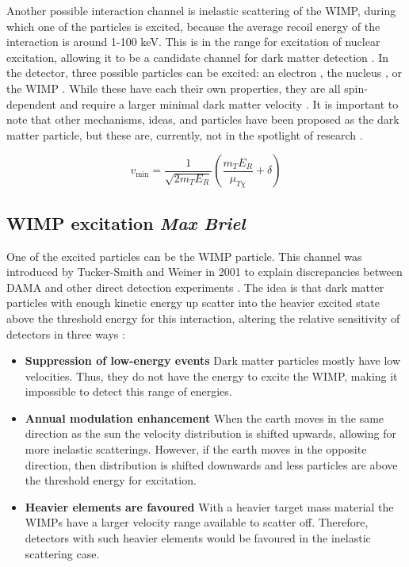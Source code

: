 \documentclass{article}
\begin{document}
Another possible interaction channel is inelastic scattering of the WIMP, during which one of the particles is excited, because the average recoil energy of the interaction is around 1-100 keV. This is in the range for excitation of nuclear excitation, allowing it to be a candidate channel for dark matter detection \cite{Goodman:1984dc, Ellis:1988nb}. In the detector, three possible particles can be excited: an electron \cite{Starkman:1994gf}, the nucleus \cite{Ellis:1988nb}, or the WIMP \cite{TuckerSmith:2001hy, TuckerSmith:2004jv, Miao:2013sqa}. While these have each their own properties, they are all spin-dependent \cite{McCabe:2015eia} and require a larger minimal dark matter velocity \cite{TuckerSmith:2001hy}. It is important to note that other mechanisms, ideas, and particles have been proposed \cite{TuckerSmith:2004jv,Foot:2013uxa, Undagoitia:2015gya, Bramante:2016rdh} as the dark matter particle, but these are, currently, not in the spotlight of research \cite{Agnese:2018col}. 

\begin{equation} \label{vmin_inel}
    v_\text{min} = \frac{1}{\sqrt{2m_TE_R}} \left(\frac{m_TE_R}{\mu_{T \chi}} + \delta \right)
\end{equation}


\subsection{WIMP excitation \small{\textit{Max Briel}}} 

One of the excited particles can be the WIMP particle. This channel was introduced by Tucker-Smith and Weiner in 2001 \cite{TuckerSmith:2001hy} to explain discrepancies between DAMA \cite{Finkbeiner:2009ug} and other direct detection experiments \cite{Chang:2008gd, Ahmed:2008eu}. The idea is that dark matter particles with enough kinetic energy up scatter into the heavier excited state above the threshold energy for this interaction, altering the relative sensitivity of detectors in three ways \cite{TuckerSmith:2001hy, TuckerSmith:2004jv, Chang:2008gd}:
\begin{itemize}
    \item \textbf{Suppression of low-energy events} Dark matter particles mostly have low velocities. Thus, they do not have the energy to excite the WIMP, making it impossible to detect this range of energies. 

    \item \textbf{Annual modulation enhancement} When the earth moves in the same direction as the sun the velocity distribution is shifted upwards, allowing for more inelastic scatterings. However, if the earth moves in the opposite direction, then distribution is shifted downwards and less particles are above the threshold energy for excitation. 

    \item \textbf{Heavier elements are favoured} With a heavier target mass material the WIMPs have a larger velocity range available to scatter off. Therefore, detectors with such heavier elements would be favoured in the inelastic scattering case. 
\end{itemize}
\end{document}
